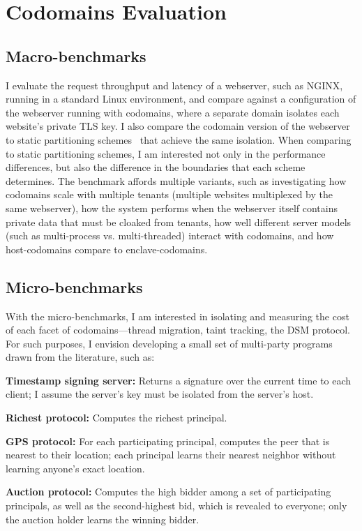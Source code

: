 \section{Codomains Evaluation}
\label{sec:codomains-eval}


\subsection{Macro-benchmarks}

%
I evaluate the request throughput and latency of a webserver, such as NGINX,
running in a standard Linux environment, and compare against a configuration of
the webserver running with codomains, where a separate domain isolates each
website's private TLS key.
%
I also compare the codomain version of the webserver to 
static partitioning schemes~\cite{eleos,glamdring,privtrans} that achieve
the same isolation.
%
When comparing to static partitioning schemes, I am interested not only in the
performance differences, but also the difference in the boundaries that
each scheme determines.
%
The benchmark affords multiple variants, such as investigating how codomains
scale with multiple tenants (multiple websites multiplexed by the same
webserver), how the system performs when the webserver itself contains
private data that must be cloaked from tenants, how well different server
models (such as multi-process vs. multi-threaded) interact with codomains, and
how host-codomains compare to enclave-codomains.






\subsection{Micro-benchmarks}

With the micro-benchmarks, I am interested in isolating and measuring the cost
of each facet of codomains---thread migration, taint tracking, the DSM
protocol.
%
For such purposes, I envision developing a small set of multi-party programs
drawn from the literature, such as:

\begin{widelist}
\item \textbf{Timestamp signing server:} Returns a signature over the current
time to each client; I assume the server's key must be isolated from the
server's host.
%
\item \textbf{Richest protocol:} Computes the richest principal.
%
\item \textbf{GPS protocol:} For each participating principal,
computes the peer that is nearest to their location; each principal learns
their nearest neighbor without learning anyone's exact location.
%
\item \textbf{Auction protocol:} Computes the high bidder among a set of
participating principals, as well as the second-highest bid, which is revealed
to everyone; only the auction holder learns the winning bidder.
\end{widelist}

